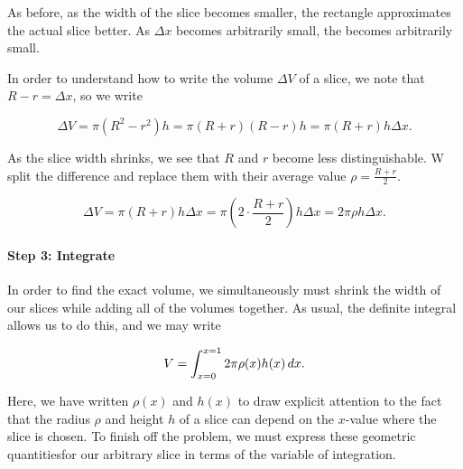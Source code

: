 \documentclass{ximera}
\begin{document}
\begin{model}
\begin{image}

            \end{image}
            
As before, as the width of the slice becomes smaller, the rectangle approximates the actual slice better.  As $\Delta x$ becomes arbitrarily small, the  becomes arbitrarily small.

In order to understand how to write the volume $\Delta V$ of a slice, we note that $R-r = \Delta x$, so we write

\[
\Delta V = \pi (R^2-r^2)h = \pi(R+r)(R-r)h = \pi(R+r)h \Delta x.
\] 

As the slice width shrinks, we see that $R$ and $r$ become less distinguishable.  W split the difference and replace them with their average value $\rho = \frac{R+r}{2}$.

\[
\Delta V = \pi (R+r)h \Delta x = \pi \left(2 \cdot \frac{R+r}{2} \right)h \Delta x  = 2\pi \rho h \Delta x.
\]        

\paragraph{Step 3: Integrate}
In order to find the exact volume, we simultaneously must shrink the width of our slices while adding all of the volumes together.  As usual, the definite integral allows us to do this, and we may write

\[
V= \int_{x=0}^{x=1} 2 \pi \rho(x) h(x) \mathop{}\!d x .
\]    

Here, we have written $\rho(x)$ and $h(x)$ to draw explicit attention to the fact that the radius $\rho$ and height $h$ of a slice can depend  on the $x$-value where the slice is chosen. To finish off the problem, we must express these geometric quantitiesfor our arbitrary slice in terms of the variable of integration.


\end{model}
\end{document}
